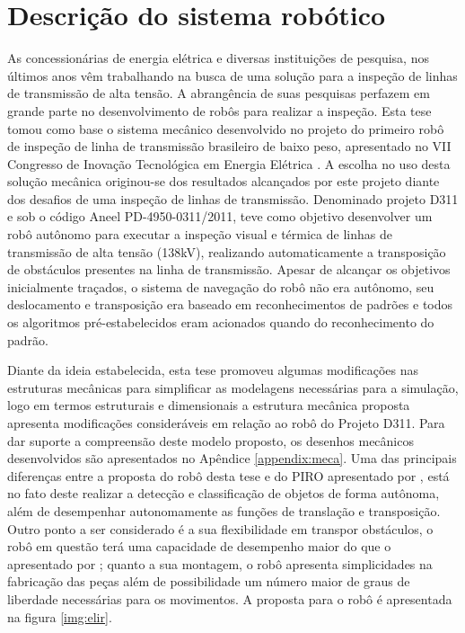 \section{Descrição do sistema robótico}
\label{sec:desc}
As concessionárias de energia elétrica e diversas instituições de pesquisa, nos últimos anos vêm trabalhando na busca de uma solução para a inspeção de linhas de transmissão de alta tensão. A abrangência de suas pesquisas perfazem em grande parte no desenvolvimento de robôs para realizar a inspeção. 
Esta tese tomou como base o sistema mecânico desenvolvido no projeto do primeiro robô de inspeção de linha de transmissão brasileiro de baixo peso, apresentado no VII Congresso de Inovação Tecnológica em Energia Elétrica \cite{mourao2015robolinhas}.
A escolha no uso desta solução mecânica originou-se dos resultados alcançados por este projeto diante dos desafios de uma inspeção de linhas de transmissão. Denominado projeto D311 e sob o código Aneel PD-4950-0311/2011, teve como objetivo desenvolver um robô autônomo para executar a inspeção visual e térmica de linhas de transmissão de alta tensão (138kV), realizando automaticamente a transposição de obstáculos presentes na linha de transmissão.
Apesar de alcançar os objetivos inicialmente traçados, o sistema de navegação do robô não era autônomo, seu deslocamento e transposição era baseado em reconhecimentos de padrões e todos os algoritmos pré-estabelecidos eram acionados quando do reconhecimento do padrão.

Diante da ideia estabelecida, esta tese promoveu algumas modificações nas estruturas mecânicas para simplificar as modelagens necessárias para a simulação, logo em termos estruturais e dimensionais a estrutura mecânica proposta apresenta modificações consideráveis em relação ao robô do Projeto D311. Para dar suporte a compreensão deste modelo proposto, os desenhos mecânicos desenvolvidos são apresentados no Apêndice \ref{appendix:meca}. Uma das principais diferenças entre a proposta do robô desta tese e do PIRO apresentado por , está no fato deste realizar a detecção e classificação de objetos de forma autônoma, além de desempenhar autonomamente as funções de translação e transposição. Outro ponto a ser considerado é a sua flexibilidade em transpor obstáculos, o robô em questão terá uma capacidade de desempenho maior do que o apresentado por \cite{mourao2015robolinhas}; quanto a sua montagem, o robô apresenta simplicidades na fabricação das peças além de possibilidade um número maior de graus de liberdade necessárias para os movimentos. A proposta para o robô é apresentada na figura \ref{img:elir}.

